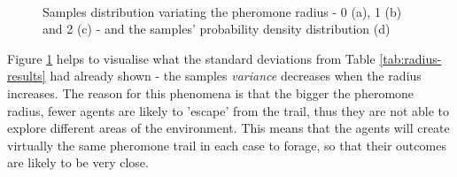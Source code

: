 \begin{figure}[H]
\myfloatalign
{} \quad
{} \\
 \quad
{}

\caption[Radius variation - samples distributions]{Samples distribution variating the pheromone radius - 0 (a), 1 (b) and 2 (c) - and the samples' probability density distribution (d)}\label{fig:radius}
\end{figure}

Figure \ref{fig:radius} helps to visualise what the standard deviations from Table \ref{tab:radius-results} had already shown - the samples \emph{variance} decreases when the radius increases. The reason for this phenomena is that the bigger the pheromone radius, fewer agents are likely  to 'escape' from the trail, thus they are not able to explore different areas of the environment. This means that the agents will create virtually the same pheromone trail in each case to forage, so that their outcomes are likely to be very close.  

